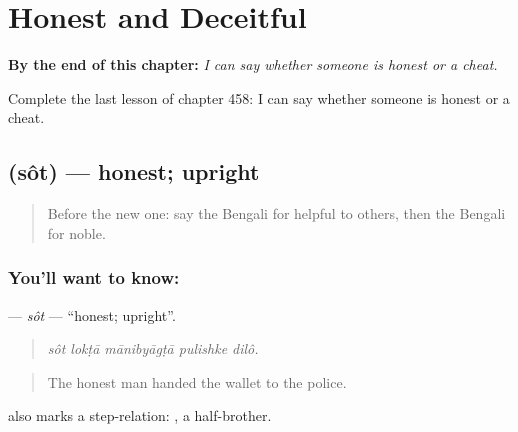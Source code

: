 
\chapter{Honest and Deceitful}
\label{ch:bn-honest-and-deceitful}

\begin{chapteropening}
\textbf{By the end of this chapter:} \emph{I can say whether someone is honest or a cheat.}

Complete the last lesson of chapter 458: I can say whether someone is honest or a cheat.
\end{chapteropening}

\section[\texorpdfstring{\bn{সৎ} (sôt)}{সৎ (sôt)}]{ (sôt) — honest; upright}

\label{lesson:BN-C458-sot}



\begin{quote}
Before the new one: say the Bengali for helpful to others, then the Bengali for noble.
\end{quote}

\subsection*{You'll want to know: }
\textbf{} — \emph{sôt} — \textquotedblleft{}honest; upright\textquotedblright{}.

\begin{quote}
    
\end{quote}

\begin{quote}
\emph{sôt lokṭā mānibyāgṭā pulishke dilô.}
\end{quote}

\begin{quote}
The honest man handed the wallet to the police.
\end{quote}

 also marks a step-relation:  , a half-brother.

